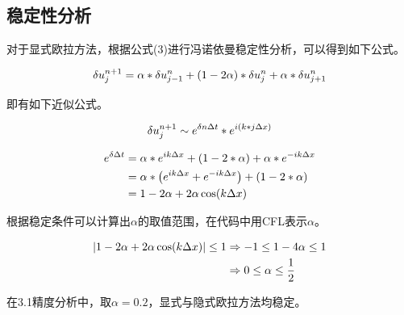 \documentclass[final]{cvpr}
\begin{document}
\subsection{稳定性分析}
对于显式欧拉方法，根据公式(3)进行冯诺依曼稳定性分析，可以得到如下公式。
\begin{center}
	\begin{scriptsize}
		\begin{equation}
			\begin{aligned}
				\setlength{\abovedisplayskip}{-5pt}
				\delta u_{j}^{n+1}=\alpha * \delta u_{j-1}^{n}+(1-2 \alpha) * \delta u_{j}^{n}+\alpha * \delta u_{j+1}^{n} 
			\end{aligned}
		\end{equation}
	\end{scriptsize}
\end{center}
即有如下近似公式。
\begin{center}
	\begin{scriptsize}
		\begin{equation}
			\setlength{\abovedisplayskip}{-5pt}
\delta u_{j}^{n+1} \sim e^{\delta n \Delta t} * e^{i(k * j \Delta x)}
		\end{equation}
	\end{scriptsize}
\end{center}
\begin{center}
	\begin{scriptsize}
		\begin{equation}
			\begin{aligned}
				\setlength{\abovedisplayskip}{-5pt}
				e^{\delta \Delta t}&=\alpha * e^{i k \Delta x}+(1-2 * \alpha)+\alpha * e^{-i k \Delta x}\\
				&=\alpha *\left(e^{i k \Delta x}+e^{-i k \Delta x}\right)+(1-2 * \alpha) \\
				&=1-2 \alpha+2 \alpha \cos (k \Delta x)
			\end{aligned}
		\end{equation}
	\end{scriptsize}
\end{center}
根据稳定条件可以计算出$\alpha$的取值范围，在代码中用CFL表示$\alpha$。
\begin{center}
	\begin{scriptsize}
		\begin{equation}
			\begin{aligned}
			\setlength{\abovedisplayskip}{-5pt}
			|1-2 \alpha+2 \alpha \cos (k \Delta x)| \leq 1&\Rightarrow-1 \leq 1-4 \alpha \leq 1  \\
			&\Rightarrow 0 \leq \alpha \leq \frac{1}{2}
			\end{aligned}
		\end{equation}
	\end{scriptsize}
\end{center}
在3.1精度分析中，取$\alpha=0.2$，显式与隐式欧拉方法均稳定。
\end{document}
